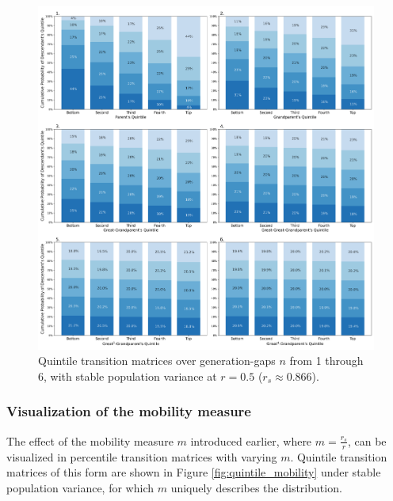 \documentclass[a4paper,11pt]{article} %
\begin{document}
\begin{figure}[H]
\centering
\advance\leftskip-0.6in
\includegraphics[width=6.5in]{figures/quintile-r=0.5-stable.png} 
\caption{Quintile transition matrices over generation-gaps $n$ from 1 through 6, with stable population variance at $r = 0.5$ ($r_s \approx 0.866$).}
\label{fig:quintile_stable}
\end{figure}

\subsubsection*{Visualization of the mobility measure}
The effect of the mobility measure $m$ introduced earlier, where $m = \frac{r_s}{r}$, can be visualized in percentile transition matrices with varying $m$. Quintile transition matrices of this form are shown in Figure \ref{fig:quintile_mobility} under stable population variance, for which $m$ uniquely describes the distribution.
\end{document}
